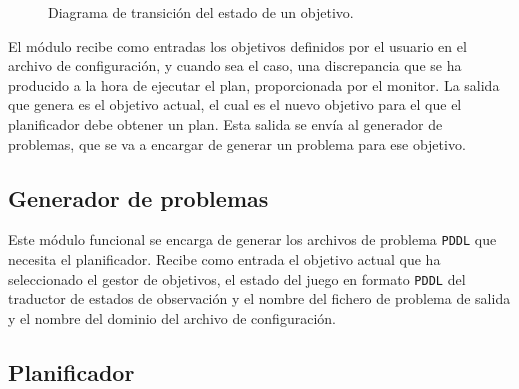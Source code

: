 \begin{figure}[H]
    \centering
    \caption{Diagrama de transición del estado de un objetivo.}
    \label{fig:goal_transition}
\end{figure}

El módulo recibe como entradas los objetivos definidos por el usuario en el archivo de configuración,
y cuando sea el caso, una discrepancia que se ha producido a la hora de ejecutar el plan, proporcionada
por el monitor. La salida que genera es el objetivo actual, el cual es el nuevo objetivo para el que
el planificador debe obtener un plan. Esta salida se envía al generador de problemas, que se va a encargar
de generar un problema para ese objetivo.

\subsection{Generador de problemas}
\label{sec:problem-generator}

Este módulo funcional se encarga de generar los archivos de problema \texttt{PDDL} que necesita
el planificador. Recibe como entrada el objetivo actual que ha seleccionado el gestor de objetivos,
el estado del juego en formato \texttt{PDDL} del traductor de estados de observación y el nombre del
fichero de problema de salida y el nombre del dominio del archivo de configuración.

\subsection{Planificador}

